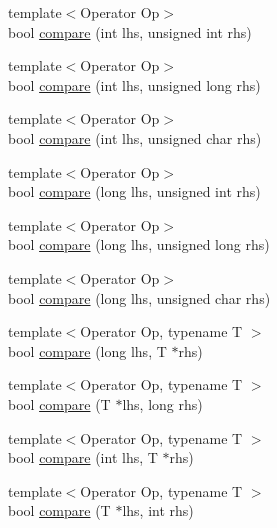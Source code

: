 \begin{DoxyCompactItemize}
\item 
{\footnotesize template$<$Operator Op$>$ }\\bool \mbox{\hyperlink{namespace_catch_1_1_internal_a17c92ed4b6d88a9f8bbcbc52544fe40f}{compare}} (int lhs, unsigned int rhs)
\item 
{\footnotesize template$<$Operator Op$>$ }\\bool \mbox{\hyperlink{namespace_catch_1_1_internal_aac7a6452ed0d324031ceb7b4f3a3b61c}{compare}} (int lhs, unsigned long rhs)
\item 
{\footnotesize template$<$Operator Op$>$ }\\bool \mbox{\hyperlink{namespace_catch_1_1_internal_a7e82d987f62b9822107027c72a55fa6b}{compare}} (int lhs, unsigned char rhs)
\item 
{\footnotesize template$<$Operator Op$>$ }\\bool \mbox{\hyperlink{namespace_catch_1_1_internal_a0b4783ede1901e5c1baf8ff909bcce8d}{compare}} (long lhs, unsigned int rhs)
\item 
{\footnotesize template$<$Operator Op$>$ }\\bool \mbox{\hyperlink{namespace_catch_1_1_internal_ae9aec44a08d9cbb0d3dd46d438b50d2c}{compare}} (long lhs, unsigned long rhs)
\item 
{\footnotesize template$<$Operator Op$>$ }\\bool \mbox{\hyperlink{namespace_catch_1_1_internal_a79664b5f5f497fba57bd156e098de1f2}{compare}} (long lhs, unsigned char rhs)
\item 
{\footnotesize template$<$Operator Op, typename T $>$ }\\bool \mbox{\hyperlink{namespace_catch_1_1_internal_a829570ad9e724c687aa42190a696032b}{compare}} (long lhs, T $\ast$rhs)
\item 
{\footnotesize template$<$Operator Op, typename T $>$ }\\bool \mbox{\hyperlink{namespace_catch_1_1_internal_a3f89c65fdb06aa7b648c5acf0ca107a9}{compare}} (T $\ast$lhs, long rhs)
\item 
{\footnotesize template$<$Operator Op, typename T $>$ }\\bool \mbox{\hyperlink{namespace_catch_1_1_internal_a4f30c29e4adb62c7e209e5b988e59397}{compare}} (int lhs, T $\ast$rhs)
\item 
{\footnotesize template$<$Operator Op, typename T $>$ }\\bool \mbox{\hyperlink{namespace_catch_1_1_internal_a95361ddae55c9a390e6510bdadccb1fc}{compare}} (T $\ast$lhs, int rhs)
\end{DoxyCompactItemize}


